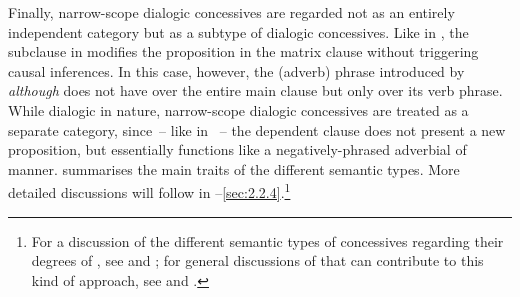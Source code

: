 Finally, narrow-scope dialogic concessives are regarded not as an entirely independent category but as a subtype of dialogic concessives. Like in , the subclause in  modifies the proposition in the matrix clause without triggering causal inferences. In this case, however, the (adverb) phrase introduced by \textit{although} does not have  over the entire main clause but only over its verb phrase. While dialogic in nature, narrow-scope dialogic concessives are treated as a separate category, since~– like in ~– the dependent clause does not present a new proposition, but essentially functions like a negatively-phrased adverbial of manner.  summarises the main traits of the different semantic types. More detailed discussions will follow in --\ref{sec:2.2.4}.\footnote{\label{bkm:Ref504053828}For a discussion of the different semantic types of concessives regarding their degrees of , see \citet{Crevels2000,Hilpert2013a} and \citet{Schützler2018b}; for general discussions of  that can contribute to this kind of approach, see \textcites{Benveniste1971}[26–27]{HallidayHasan1976}{Traugott1989}{Traugott2010}{Traugott2014} and \citet{Langacker1985,Langacker1990}.}

